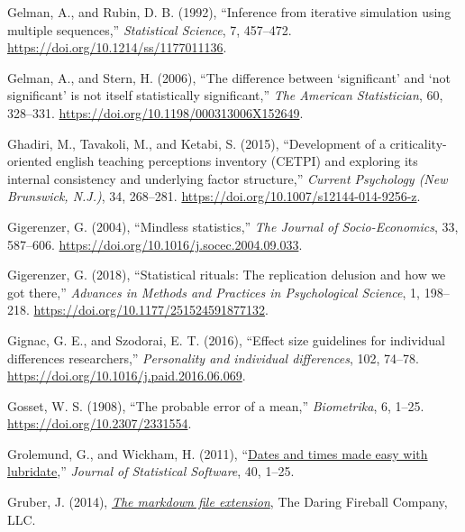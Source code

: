 \documentclass[
  10pt,
  a4paper,
  twoside]{article}
\newlength{\cslhangindent}
\newenvironment{CSLReferences}[2] %
 {\begin{list}{}{%
  \setlength{\itemindent}{0pt}
  \setlength{\leftmargin}{0pt}
  \setlength{\parsep}{0pt}
  \ifodd #1
   \setlength{\leftmargin}{\cslhangindent}
   \setlength{\itemindent}{-1\cslhangindent}
  \fi
  \setlength{\itemsep}{#2\baselineskip}}}
 {\end{list}}
\begin{document}
\begin{CSLReferences}{1}{0}
Gelman, A., and Rubin, D. B. (1992), {``Inference from iterative simulation using multiple sequences,''} \emph{Statistical Science}, 7, 457--472. \url{https://doi.org/10.1214/ss/1177011136}.

Gelman, A., and Stern, H. (2006), {``The difference between {`significant'} and {`not significant'} is not itself statistically significant,''} \emph{The American Statistician}, 60, 328--331. \url{https://doi.org/10.1198/000313006X152649}.

Ghadiri, M., Tavakoli, M., and Ketabi, S. (2015), {``Development of a criticality-oriented english teaching perceptions inventory (CETPI) and exploring its internal consistency and underlying factor structure,''} \emph{Current Psychology (New Brunswick, N.J.)}, 34, 268--281. \url{https://doi.org/10.1007/s12144-014-9256-z}.

Gigerenzer, G. (2004), {``Mindless statistics,''} \emph{The Journal of Socio-Economics}, 33, 587--606. \url{https://doi.org/10.1016/j.socec.2004.09.033}.

Gigerenzer, G. (2018), {``Statistical rituals: The replication delusion and how we got there,''} \emph{Advances in Methods and Practices in Psychological Science}, 1, 198--218. \url{https://doi.org/10.1177/251524591877132}.

Gignac, G. E., and Szodorai, E. T. (2016), {``Effect size guidelines for individual differences researchers,''} \emph{Personality and individual differences}, 102, 74--78. \url{https://doi.org/10.1016/j.paid.2016.06.069}.

Gosset, W. S. (1908), {``The probable error of a mean,''} \emph{Biometrika}, 6, 1--25. \url{https://doi.org/10.2307/2331554}.

Grolemund, G., and Wickham, H. (2011), {``\href{https://www.jstatsoft.org/v40/i03/}{Dates and times made easy with {lubridate}},''} \emph{Journal of Statistical Software}, 40, 1--25.

Gruber, J. (2014), \emph{\href{https://daringfireball.net/linked/2014/01/08/markdown-extension}{The markdown file extension}}, The Daring Fireball Company, LLC.


\end{CSLReferences}
\end{document}

